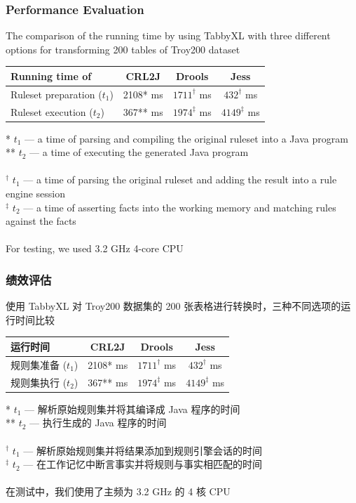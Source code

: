\documentclass[10pt]{beamer}
\begin{document}
\begin{frame}
\frametitle{Performance Evaluation}
\small{The comparison of the running time by using TabbyXL with three different options for transforming 200 tables of Troy200 dataset %
}
\begin{table}
		\centering
		    \bgroup
        \def\arraystretch{1.5}
				\begin{tabular}{|l|c|c|c|}
						\hline
									Running time of             & CRL2J   & Drools  & Jess     \\
						\hline
									Ruleset preparation ($t_1$) & 2108* ms & $1711^\dagger$ ms & $432^\dagger$  ms \\
                  Ruleset execution ($t_2$)   & 367** ms & $1974^\ddagger$ ms & $4149^\ddagger$ ms \\
			      \hline
		    \end{tabular}
				\egroup
\end{table}
\scriptsize{
* $t_1$ --- a time of parsing and compiling the original ruleset into a Java program \\
** $t_2$ --- a time of executing the generated Java program
\\~\\
$^\dagger$ $t_1$ --- a time of parsing the original ruleset and adding the result into a rule engine session \\
$^\ddagger$ $t_2$ --- a time of asserting facts into the working memory and matching rules against the facts
\\~\\
For testing, we used 3.2 GHz 4-core CPU
}
\end{frame}

\begin{frame}
\frametitle{绩效评估}
\small{使用 TabbyXL 对 Troy200 数据集的 200 张表格进行转换时，三种不同选项的运行时间比较 %
}
\begin{table}
		\centering
		    \bgroup
        \def\arraystretch{1.5}
				\begin{tabular}{|l|c|c|c|}
						\hline
									运行时间             & CRL2J   & Drools  & Jess     \\
						\hline
									规则集准备 ($t_1$) & 2108* ms & $1711^\dagger$ ms & $432^\dagger$  ms \\
                  规则集执行 ($t_2$)   & 367** ms & $1974^\ddagger$ ms & $4149^\ddagger$ ms \\
			      \hline
		    \end{tabular}
				\egroup
\end{table}
\scriptsize{
* $t_1$ --- 解析原始规则集并将其编译成 Java 程序的时间 \\
** $t_2$ --- 执行生成的 Java 程序的时间
\\~\\
$^\dagger$ $t_1$ --- 解析原始规则集并将结果添加到规则引擎会话的时间 \\
$^\ddagger$ $t_2$ --- 在工作记忆中断言事实并将规则与事实相匹配的时间
\\~\\
在测试中，我们使用了主频为 3.2 GHz 的 4 核 CPU
}
\end{frame}
\end{document}
